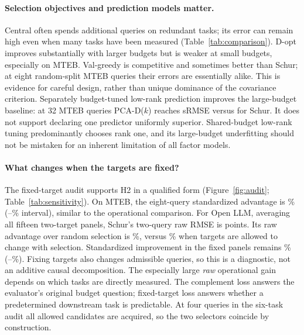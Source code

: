 \documentclass{article}
\begin{document}
\begin{table}[t]
\centering\small
\caption{Paired improvement of Schur over random queries, in standardized RMSE. Positive gains favor Schur. Intervals condition on fitted runs.}
\label{tab:paired}
\end{table}

\paragraph{Selection objectives and prediction models matter.}
Central often spends additional queries on redundant tasks; its error can remain high even when many tasks have been measured (Table~\ref{tab:comparison}). D-opt improves substantially with larger budgets but is weaker at small budgets, especially on MTEB. Val-greedy is competitive and sometimes better than Schur; at eight random-split MTEB queries their errors are essentially alike. This is evidence for careful design, rather than unique dominance of the covariance criterion. Separately budget-tuned low-rank prediction improves the large-budget baseline: at 32 MTEB queries PCA-D($k$) reaches \PCAThirtyTwo{} sRMSE versus \MThirtyTwo{} for Schur. It does not support declaring one predictor uniformly superior. Shared-budget low-rank tuning predominantly chooses rank one, and its large-budget underfitting should not be mistaken for an inherent limitation of all factor models.

\begin{table}[t]
\centering\small\setlength{\tabcolsep}{3.5pt}
\caption{Random-row split sRMSE. First four selector baselines share Schur's predictor. PCA-R($k$) and PCA-D($k$) use independently budget-tuned low-rank prediction. All confidence intervals, including shared-budget PCA, are in Appendix~\ref{app:full}.}
\label{tab:comparison}
\end{table}

\paragraph{What changes when the targets are fixed?}
The fixed-target audit supports H2 in a qualified form (Figure~\ref{fig:audit}; Table~\ref{tab:sensitivity}). On MTEB, the eight-query standardized advantage is \MFixGain\% (\MFixLo--\MFixHi\% interval), similar to the operational comparison. For Open LLM, averaging all fifteen two-target panels, Schur's two-query raw RMSE is \LFixRaw{} points. Its raw advantage over random selection is \LFixRawGain\%, versus \LRawGain\% when targets are allowed to change with selection. Standardized improvement in the fixed panels remains \LFixGain\% (\LFixLo--\LFixHi\%). Fixing targets also changes admissible queries, so this is a diagnostic, not an additive causal decomposition. The especially large \emph{raw} operational gain depends on which tasks are directly measured. The complement loss answers the evaluator's original budget question; fixed-target loss answers whether a predetermined downstream task is predictable. At four queries in the six-task audit all allowed candidates are acquired, so the two selectors coincide by construction.
\end{document}
